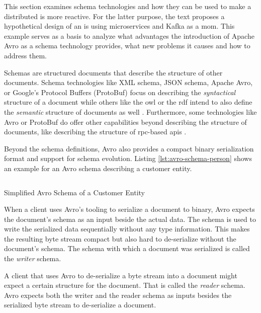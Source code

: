 This section examines schema technologies and how they can be used to make a distributed \gls{is} more reactive.
For the latter purpose, the text proposes a hypothetical design of an \gls{is} using microservices and Kafka as a \gls{mom}.
This example serves as a basis to analyze what advantages the introduction of Apache Avro as a schema technology provides, what new problems it causes and how to address them.

Schemas are structured documents that describe the structure of other documents.
Schema technologies like XML schema, JSON schema, Apache Avro, or Google's Protocol Buffers (ProtoBuf) focus on describing the \emph{syntactical} structure of a document while others like the \gls{owl} or the \gls{rdf} intend to also define the \emph{semantic} structure of documents as well \parencites{xmlschema}{jsonschema}{avro}{protobuf}{owl}{rdf}.
Furthermore, some technologies like Avro or ProtoBuf do offer other capabilities beyond describing the structure of documents, like describing the structure of \gls{rpc}-based \glspl{api} \parencites{avro}{protobuf}.


Beyond the schema definitions, Avro also provides a compact binary serialization format and support for schema evolution.
Listing \ref{lst:avro-schema-person} shows an example for an Avro schema describing a customer entity.
\parencite{avro}

\begin{listing}[H]
  \inputminted{json}{assets/src/Customer.avsc}
  \caption{Simplified Avro Schema of a Customer Entity}\label{lst:avro-schema-person}
\end{listing}

When a client uses Avro's tooling to serialize a document to binary, Avro expects the document's schema as an input beside the actual data.
The schema is used to write the serialized data sequentially without any type information. 
This makes the resulting byte stream compact but also hard to de-serialize without the document's schema.
The schema with which a document was serialized is called the \emph{writer} schema.
\parencite{avro}

A client that uses Avro to de-serialize a byte stream into a document might expect a certain structure for the document.
That is called the \emph{reader} schema.
Avro expects both the writer and the reader schema as inputs besides the serialized byte stream to de-serialize a document.
\parencite{avro}

